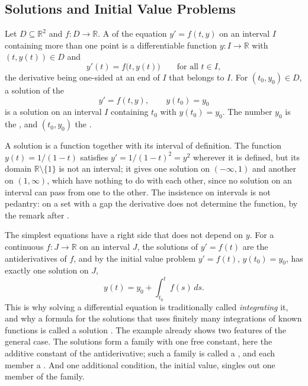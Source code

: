 \subsection{Solutions and Initial Value Problems}

\begin{definition}
\label{def:ode-solution}
Let $D\subseteq\mathbb R^2$ and $f\colon D\to\mathbb R$. A  of the equation $y'=f(t,y)$ on an interval $I$ containing more than one point is a differentiable function $y\colon I\to\mathbb R$ with $(t,y(t))\in D$ and
\[
y'(t)=f\bigl(t,y(t)\bigr)\qquad\text{for all }t\in I ,
\]
the derivative being one-sided at an end of $I$ that belongs to $I$. For $(t_0,y_0)\in D$, a solution of the 
\begin{equation}
y'=f(t,y),\qquad y(t_0)=y_0
\label{eq:ivp}
\end{equation}
is a solution on an interval $I$ containing $t_0$ with $y(t_0)=y_0$. The number $y_0$ is the , and $(t_0,y_0)$ the .
\end{definition}

A solution is a function together with its interval of definition. The function $y(t)=1/(1-t)$ satisfies $y'=1/(1-t)^2=y^2$ wherever it is defined, but its domain $\mathbb R\setminus\{1\}$ is not an interval; it gives one solution on $(-\infty,1)$ and another on $(1,\infty)$, which have nothing to do with each other, since no solution on an interval can pass from one to the other. The insistence on intervals is not pedantry: on a set with a gap the derivative does not determine the function, by the remark after .

The simplest equations have a right side that does not depend on $y$. For a continuous $f\colon J\to\mathbb R$ on an interval $J$, the solutions of $y'=f(t)$ are the antiderivatives of $f$, and by  the initial value problem $y'=f(t)$, $y(t_0)=y_0$, has exactly one solution on $J$,
\[
y(t)=y_0+\int_{t_0}^tf(s)\,ds .
\]
This is why solving a differential equation is traditionally called \emph{integrating} it, and why a formula for the solutions that uses finitely many integrations of known functions is called a solution . The example already shows two features of the general case. The solutions form a family with one free constant, here the additive constant of the antiderivative; such a family is called a , and each member a . And one additional condition, the initial value, singles out one member of the family.

